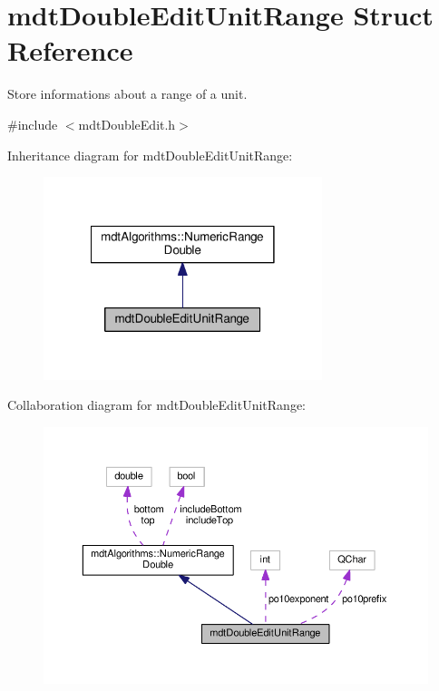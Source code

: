 \hypertarget{structmdt_double_edit_unit_range}{\section{mdt\-Double\-Edit\-Unit\-Range Struct Reference}
\label{structmdt_double_edit_unit_range}
}


Store informations about a range of a unit.  




{\ttfamily \#include $<$mdt\-Double\-Edit.\-h$>$}



Inheritance diagram for mdt\-Double\-Edit\-Unit\-Range\-:\nopagebreak
\begin{figure}[H]
\begin{center}
\leavevmode
\includegraphics[width=230pt]{structmdt_double_edit_unit_range__inherit__graph}
\end{center}
\end{figure}


Collaboration diagram for mdt\-Double\-Edit\-Unit\-Range\-:\nopagebreak
\begin{figure}[H]
\begin{center}
\leavevmode
\includegraphics[width=350pt]{structmdt_double_edit_unit_range__coll__graph}
\end{center}
\end{figure}
